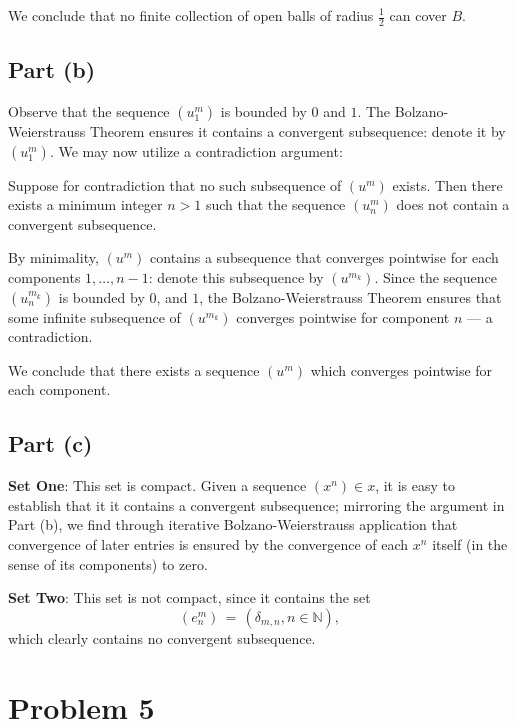 \documentclass[11pt]{article}
\begin{document}
We conclude that no finite collection of open balls of radius $\tfrac{1}{2}$ can cover $B$.


\subsection{Part (b)}

Observe that the sequence $(u_{1}^{m})$ is bounded by $0$ and $1$. The Bolzano-Weierstrauss Theorem ensures it contains a convergent subsequence: denote it by $(u_{1}^{m})$. We may now utilize a contradiction argument:

Suppose for contradiction that no such subsequence of $(u^{m})$ exists. Then there exists a minimum integer $n > 1$ such that the sequence $(u_{n}^{m})$ does not contain a convergent subsequence.

By minimality, $(u^{m})$ contains a subsequence that converges pointwise for each components $1, \ldots, n - 1$: denote this subsequence by $(u^{m_{k}})$. Since the sequence $(u_{n}^{m_{k}})$ is bounded by $0$, and $1$, the Bolzano-Weierstrauss Theorem ensures that some infinite subsequence of $(u^{m_{k}})$ converges pointwise for component $n$ --- a contradiction.

We conclude that there exists a sequence $(u^{m})$ which converges pointwise for each component.


\subsection{Part (c)}

\textbf{Set One}: This set is $\boxed{\text{compact}}$. Given a sequence $(x^{n}) \in x$, it is easy to establish that it it contains a convergent subsequence; mirroring the argument in Part (b), we find through iterative Bolzano-Weierstrauss application that convergence of later entries is ensured by the convergence of each $x^{n}$ itself (in the sense of its components) to zero.

\textbf{Set Two}: This set is $\boxed{\text{not compact}}$, since it contains the set
\[
  (e_{n}^{m}) \, = \, (\delta_{m, n}, n \in \mathbb{N}),
\]
which clearly contains no convergent subsequence.


\section{Problem 5}
\end{document}
